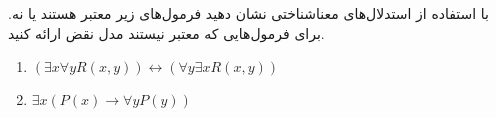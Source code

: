 با استفاده از استدلال‌های معناشناختی نشان دهید فرمول‌های زیر معتبر هستند یا نه. برای فرمول‌هایی که معتبر نیستند مدل نقض ارائه کنید.
\begin{enumerate}
\item
$(\exists x\forall y R(x,y))\leftrightarrow(\forall y \exists x R(x,y))$
\item
$\exists x(P(x)\to \forall y P(y))$
\end{enumerate}